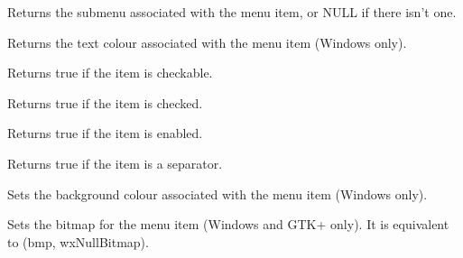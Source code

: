 \label{wxmenuitemgetsubmenu}


Returns the submenu associated with the menu item, or NULL if there isn't one.


\label{wxmenuitemgettextcolour}


Returns the text colour associated with the menu item (Windows only).


\label{wxmenuitemischeckable}


Returns true if the item is checkable.


\label{wxmenuitemischecked}


Returns true if the item is checked.


\label{wxmenuitemisenabled}


Returns true if the item is enabled.


\label{wxmenuitemisseparator}


Returns true if the item is a separator.


\label{wxmenuitemsetbackgroundcolour}


Sets the background colour associated with the menu item (Windows only).


\label{wxmenuitemsetbitmap}


Sets the bitmap for the menu item (Windows and GTK+ only). It is
equivalent to (bmp, wxNullBitmap).


\label{wxmenuitemsetbitmaps}


